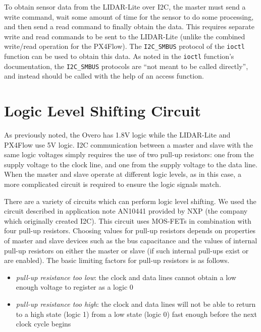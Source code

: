 \documentclass[10pt]{article}
\begin{document}
To obtain sensor data from the LIDAR-Lite over I2C, the master must send a write command, wait some amount of time for the sensor to do some processing, and then send a read command to finally obtain the data. This requires separate write and read commands to be sent to the LIDAR-Lite (unlike the combined write/read operation for the PX4Flow). The \texttt{I2C\_SMBUS} protocol of the \texttt{ioctl} function can be used to obtain this data. As noted in the \texttt{ioctl} function's documentation, the \texttt{I2C\_SMBUS} protocols are ``not meant to be called directly'', and instead should be called with the help of an access function. 


\section*{Logic Level Shifting Circuit}
As previously noted, the Overo has 1.8V logic while the LIDAR-Lite and PX4Flow use 5V logic. I2C communication between a master and slave with the same logic voltages simply requires the use of two pull-up resistors: one from the supply voltage to the clock line, and one from the supply voltage to the data line. When the master and slave operate at different logic levels, as in this case, a more complicated circuit is required to ensure the logic signals match.

There are a variety of circuits which can perform logic level shifting. We used the circuit described in application note AN10441 provided by NXP (the company which originally created I2C). This circuit uses MOS-FETs in combination with four pull-up resistors. Choosing values for pull-up resistors depends on properties of master and slave devices such as the bus capacitance and the values of internal pull-up resistors on either the master or slave (if such internal pull-ups exist or are enabled). The basic limiting factors for pull-up resistors is as follows.
\begin{itemize}
\item \textit{pull-up resistance too low}: the clock and data lines cannot obtain a low enough voltage to register as a logic 0
\item \textit{pull-up resistance too high}: the clock and data lines will not be able to return to a high state (logic 1) from a low state (logic 0) fast enough before the next clock cycle begins
\end{itemize}
\end{document}
